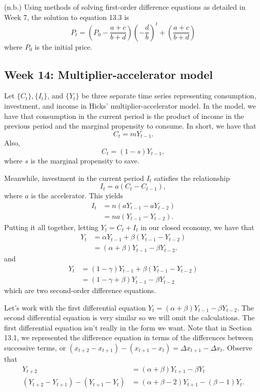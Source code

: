 \documentclass[a4paper, 12pt,oneside,openany]{book}
\begin{document}
(n.b.) Using methods of solving first-order difference equations as detailed in Week 7, the solution to equation 13.3 is $$P_t = \left( P_0 - \frac{a+c}{b+d}\right)\left(-\frac{d}{b}\right)^t+\left(\frac{a+c}{b+d}\right)$$ where $P_0$ is the initial price.

\subsection{Week 14: Multiplier-accelerator model} 

Let $\{C_t\}, \{I_t\}$, and $\{Y_t\}$ be three separate time series representing consumption, investment, and income in Hicks' multiplier-accelerator model. In the model, we have that consumption in the current period is the product of income in the previous period and the marginal propensity to consume. In short, we have that $$C_t=mY_{t-1}.$$ Also, $$C_t = (1-s)Y_{t-1},$$ where $s$ is the marginal propensity to save.

Meanwhile, investment in the current period $I_t$ satisfies the relationship $$I_t=a(C_t-C_{t-1}),$$ where $a$ is the accelerator. This yields \begin{align*}I_t&=n(aY_{t-1}-aY_{t-2}) \\ &= na(Y_{t-1}-Y_{t-2}).\end{align*} Putting it all together, letting $Y_t=C_t+I_t$ in our closed economy, we have that \begin{align*}Y_t &= \alpha Y_{t-1}+\beta(Y_{t-1}-Y_{t-2})\\ &= (\alpha+\beta)Y_{t-1}-\beta Y_{t-2}.\end{align*} and \begin{align*}Y_t &= (1-\gamma)Y_{t-1}+\beta(Y_{t-1}-Y_{t-2}) \\ &= (1-\gamma+\beta)Y_{t-1}-\beta Y_{t-2}\end{align*} which are two second-order difference equations.

Let's work with the first differential equation $Y_t=(\alpha+\beta)Y_{t-1}-\beta Y_{t-2}$. The second differential equation is very similar so we will omit the calculations. The first differential equation isn't really in the form we want. Note that in Section 13.1, we represented the difference equation in terms of the differences between successive terms, or $(x_{t+2}-x_{t+1})-(x_{t+1}-x_t)=\Delta x_{t+1}-\Delta x_t$. Observe that \begin{align*} Y_{t+2}&=(\alpha+\beta)Y_{t+1}-\beta Y_t \\ (Y_{t+2}-Y_{t+1})-(Y_{t+1}-Y_t)&=(\alpha+\beta-2)Y_{t+1}-(\beta-1) Y_t. \end{align*}
\end{document}
